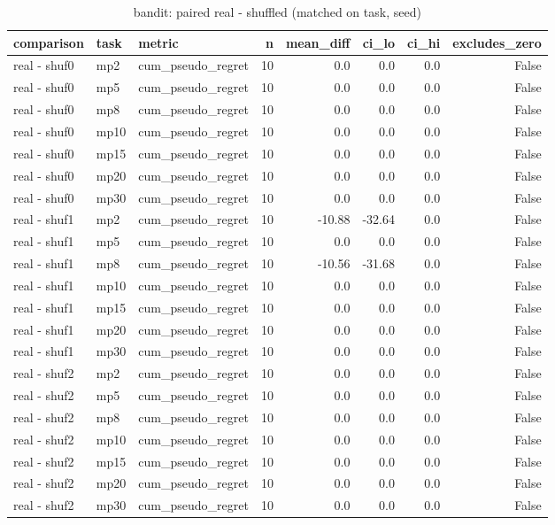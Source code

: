 \begin{table}[t]
\centering
\small
\begin{tabular}{lllrrrrr}
\toprule
comparison & task & metric & n & mean\_diff & ci\_lo & ci\_hi & excludes\_zero \\
\midrule
real - shuf0 & mp2 & cum\_pseudo\_regret & 10 & 0.0 & 0.0 & 0.0 & False \\
real - shuf0 & mp5 & cum\_pseudo\_regret & 10 & 0.0 & 0.0 & 0.0 & False \\
real - shuf0 & mp8 & cum\_pseudo\_regret & 10 & 0.0 & 0.0 & 0.0 & False \\
real - shuf0 & mp10 & cum\_pseudo\_regret & 10 & 0.0 & 0.0 & 0.0 & False \\
real - shuf0 & mp15 & cum\_pseudo\_regret & 10 & 0.0 & 0.0 & 0.0 & False \\
real - shuf0 & mp20 & cum\_pseudo\_regret & 10 & 0.0 & 0.0 & 0.0 & False \\
real - shuf0 & mp30 & cum\_pseudo\_regret & 10 & 0.0 & 0.0 & 0.0 & False \\
real - shuf1 & mp2 & cum\_pseudo\_regret & 10 & -10.88 & -32.64 & 0.0 & False \\
real - shuf1 & mp5 & cum\_pseudo\_regret & 10 & 0.0 & 0.0 & 0.0 & False \\
real - shuf1 & mp8 & cum\_pseudo\_regret & 10 & -10.56 & -31.68 & 0.0 & False \\
real - shuf1 & mp10 & cum\_pseudo\_regret & 10 & 0.0 & 0.0 & 0.0 & False \\
real - shuf1 & mp15 & cum\_pseudo\_regret & 10 & 0.0 & 0.0 & 0.0 & False \\
real - shuf1 & mp20 & cum\_pseudo\_regret & 10 & 0.0 & 0.0 & 0.0 & False \\
real - shuf1 & mp30 & cum\_pseudo\_regret & 10 & 0.0 & 0.0 & 0.0 & False \\
real - shuf2 & mp2 & cum\_pseudo\_regret & 10 & 0.0 & 0.0 & 0.0 & False \\
real - shuf2 & mp5 & cum\_pseudo\_regret & 10 & 0.0 & 0.0 & 0.0 & False \\
real - shuf2 & mp8 & cum\_pseudo\_regret & 10 & 0.0 & 0.0 & 0.0 & False \\
real - shuf2 & mp10 & cum\_pseudo\_regret & 10 & 0.0 & 0.0 & 0.0 & False \\
real - shuf2 & mp15 & cum\_pseudo\_regret & 10 & 0.0 & 0.0 & 0.0 & False \\
real - shuf2 & mp20 & cum\_pseudo\_regret & 10 & 0.0 & 0.0 & 0.0 & False \\
real - shuf2 & mp30 & cum\_pseudo\_regret & 10 & 0.0 & 0.0 & 0.0 & False \\
\bottomrule
\end{tabular}
\caption{bandit: paired real - shuffled (matched on task, seed)}
\label{tab:wiring_bandit_paired}
\end{table}